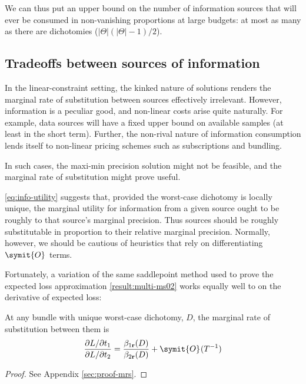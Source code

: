 \documentclass{fancyArticle}
\renewcommand{\|}{\,|\,}                    %
\providecommand{\;}{\,;}                    %
\renewcommand{\O}{\symit{O}\:\!}            %
\begin{document}
We can thus put an upper bound on the number of information sources that will ever be consumed in non-vanishing proportions at large budgets: at most as many as there are dichotomies ($|\Theta|(|\Theta|-1)/2$).

\subsection{Tradeoffs between sources of information}\label{sec:tradeoffs}

In the linear-constraint setting, the kinked nature of solutions renders the marginal rate of substitution between sources effectively irrelevant.
However, information is a peculiar good, and non-linear costs arise quite naturally.
For example, data sources will have a fixed upper bound on available samples (at least in the short term).
Further, the non-rival nature of information consumption lends itself to non-linear pricing schemes such as subscriptions and bundling.

In such cases, the maxi-min precision solution might not be feasible, and the marginal rate of substitution might prove useful.

\autoref{eq:info-utility} suggests that, provided the worst-case dichotomy is locally unique, the marginal utility for information from a given source ought to be roughly to that source's marginal precision.
Thus sources should be roughly substitutable in proportion to their relative marginal precision.
Normally, however, we should be cautious of heuristics that rely on differentiating $\O$ terms.

Fortunately, a variation of the same saddlepoint method used to prove the expected loss approximation \autoref{result:multi-ms02} works equally well to on the derivative of expected loss:
\begin{proposition}\label{result:mrs}
  At any bundle with unique worst-case dichotomy, $D$, the marginal rate of substitution between them is
  \begin{equation*}
    \frac{\partial L / \partial t_{1}}{\partial L / \partial t_{2}}
    = \frac{\beta_{1\mathbf{r}}(D)}{\beta_{2\mathbf{r}}(D)} + \O(T^{-1})
  \end{equation*}
\end{proposition}
\begin{proof}
  See Appendix \ref{sec:proof-mrs}.
  \renewcommand{\qedsymbol}{}
\end{proof}
\end{document}
